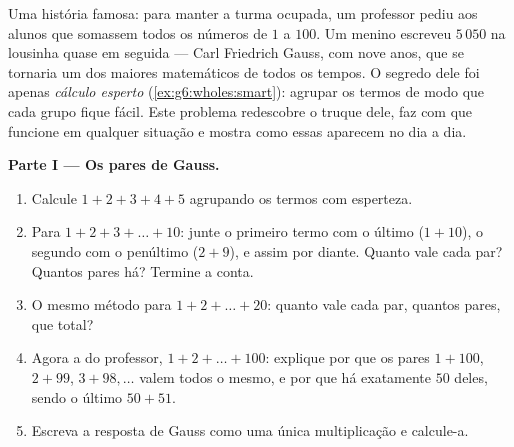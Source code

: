 \begin{problem}
\label{pb:g6:wholes:1}
Uma história famosa: para manter a turma ocupada, um professor pediu aos
alunos que somassem todos os números de $1$ a $100$. Um menino escreveu
$5\,050$ na lousinha quase em seguida --- Carl Friedrich Gauss, com nove
anos, que se tornaria um dos maiores matemáticos de todos os tempos. O
segredo dele foi apenas \emph{cálculo esperto}
(\cref{ex:g6:wholes:smart}): agrupar os termos de modo que cada grupo
fique fácil. Este problema redescobre o truque dele, faz com que funcione
em qualquer situação e mostra como essas  aparecem no dia a dia.

\medskip
\noindent\textbf{Parte I --- Os pares de Gauss.}
\begin{enumerate}
  \item Calcule $1 + 2 + 3 + 4 + 5$ agrupando os termos com esperteza.
  \item Para $1 + 2 + 3 + \dots + 10$: junte o primeiro termo com o
        último ($1 + 10$), o segundo com o penúltimo ($2 + 9$), e assim
        por diante. Quanto vale cada par? Quantos pares há? Termine a
        conta.
  \item O mesmo método para $1 + 2 + \dots + 20$: quanto vale cada par,
        quantos pares, que total?
  \item Agora a  do professor, $1 + 2 + \dots + 100$: explique por
        que os pares $1 + 100$, $2 + 99$, $3 + 98, \dots$ valem todos o
        mesmo, e por que há exatamente $50$ deles, sendo o último
        $50 + 51$.
  \item Escreva a resposta de Gauss como uma única multiplicação e
        calcule-a.
\end{enumerate}


\end{problem}
